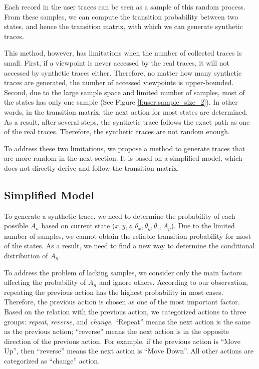 Each record in the user traces can be seen as a sample of this random process.
From these samples, we can compute the transition probability between two states, and hence
the transition matrix, with which we can generate synthetic traces.

This method, however, has limitations when the number of collected traces is small. First, if a viewpoint is 
never accessed by the real traces, it will not accessed by synthetic traces either. Therefore, no matter how
many synthetic traces are generated, the number of accessed viewpoints is upper-bounded. 
Second, due to the large sample space and limited number of samples, most of the states has only one sample
(See Figure \ref{f:user:sample_size_2}). 
In other words, in the transition matrix, the next action for most states are determined. 
As a result, after several steps, the synthetic trace follows the exact path as one of the real traces. Therefore, the synthetic traces are not random enough.

To address these two limitations, we propose a method to generate traces that are more random in the next section.
It is based on a simplified model, which does not directly derive and follow the transition matrix.

\subsection{Simplified Model}
To generate a synthetic trace, we need to determine the probability of each possible $A_n$ based on current
state ($x,y,z,\theta_x,\theta_y,\theta_z,A_p$). Due to the limited number of samples, we cannot obtain the reliable
transition probability for most of the states. As a result, we need to find a new way to determine the 
conditional distribution of $A_n$.

To address the problem of lacking samples, we consider only the main factors 
affecting the probability of $A_n$ and ignore others. 
According to our observation, 
repeating the previous action has the highest probability in most cases. 
Therefore, the previous action is chosen as one of the most important factor. 
Based on the relation with the previous action, we categorized actions to three groups: 
\textit{repeat}, \textit{reverse}, and \textit{change}. 
``Repeat'' means the next action is the same as the previous action; ``reverse'' means
the next action is in the opposite direction of the previous action. For example, if the previous action
is ``Move Up'', then ``reverse'' means the next action is ``Move Down''. All other actions are 
categorized as ``change'' action.

